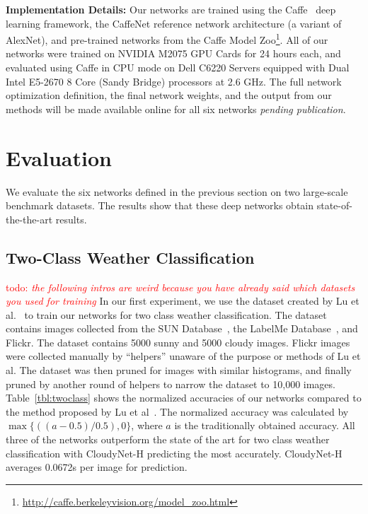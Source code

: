 \documentclass[10pt,twocolumn,letterpaper]{article}
\newcommand{\todo}[1]{\textcolor{red}{todo: {\em #1}}}
\newcommand{\tblref}[1]{Table~\ref{tbl:#1}}
\begin{document}
\textbf{Implementation Details:} Our networks are trained using the
Caffe~\cite{caffe14} deep learning framework, the CaffeNet reference network
architecture (a variant of AlexNet), and pre-trained networks
from the Caffe Model
Zoo\footnote{\url{http://caffe.berkeleyvision.org/model_zoo.html}}.
All of our networks were trained on NVIDIA M2075 GPU Cards for 24
hours each, and evaluated using Caffe in CPU mode on Dell C6220
Servers equipped with Dual Intel E5-2670 8 Core (Sandy Bridge)
processors at 2.6 GHz.  The full network optimization definition, the
final network weights, and the output from our methods will be made
available online for all six networks \emph{pending publication}.

\section{Evaluation}
We evaluate the six networks defined in the previous section on two large-scale
benchmark datasets. The results show that these deep networks obtain
state-of-the-the-art results. 


\subsection{Two-Class Weather Classification}
\todo{the following intros are weird because you have already said which
datasets you used for training}
In our first experiment, we use the dataset created by Lu et
al.~\cite{lutwoclass} to train our networks for two class weather
classification.  The dataset contains images collected from the SUN
Database~\cite{xiaoSUN}, the LabelMe Database~\cite{russell2008labelme}, and
Flickr. The dataset contains 5000 sunny and 5000 cloudy images. Flickr images
were collected manually by ``helpers'' unaware of the purpose or methods of Lu
et al. The dataset was then pruned for images with similar histograms, and
finally pruned by another round of helpers to narrow the dataset to 10,000
images.  \tblref{twoclass} shows the normalized accuracies of our networks
compared to the method proposed by Lu et al~\cite{lutwoclass}.  The normalized
accuracy was calculated by $ \max\{((a - 0.5) / 0.5), 0\} $, where $a$ is the
traditionally obtained accuracy. All three of the networks outperform the state
of the art for two class weather classification with CloudyNet-H predicting the
most accurately.  CloudyNet-H averages 0.0672s per image for prediction. 
\end{document}
